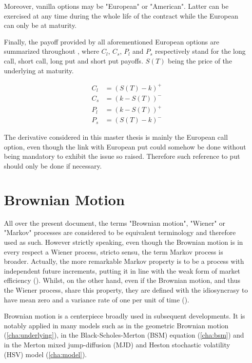 \documentclass[a4paper, 12pt]{report}
\begin{document}
Moreover, vanilla options may be "European" or "American". Latter can be exercised at any time during the whole life of the contract while the European can only be at maturity.

Finally, the payoff provided by all aforementioned European options are summarized throughout , where $C_l$, $C_s$, $P_l$ and $P_s$ respectively stand for the long call, short call, long put and short put payoffs. $S(T)$ being the price of the underlying at maturity.

\begin{align}
C_l &= \left(S(T) - k\right)^+ \label{eq:upstream:cl}\\
C_s &= \left(k - S(T)\right)^- \label{eq:upstream:cs}\\
P_l &= \left(k - S(T)\right)^+ \label{eq:upstream:pl}\\
P_s &= \left(S(T) - k\right)^- \label{eq:upstream:ps}
\end{align}

The derivative considered in this master thesis is mainly the European call option, even though the link with European put could somehow be done without being mandatory to exhibit the issue so raised. Therefore such reference to put should only be done if necessary.

\section{Brownian Motion}
\label{sec:upstream:brownian}
 
All over the present document, the terms "Brownian motion", "Wiener" or "Markov" processes are considered to be equivalent terminology and therefore used as such. However strictly speaking, even though the Brownian motion is in every respect a Wiener process, stricto sensu, the term Markov process is broader. 
Actually, the more remarkable Markov property is to be a process with independent future increments, putting it in line with the weak form of market efficiency (\citet{hull}).
Whilst, on the other hand, even if the Brownian motion, and thus the Wiener process, share this property, they are defined with the idiosyncrasy to have mean zero and a variance rate of one per unit of time (\citet{hull}).

Brownian motion is a centerpiece broadly used in subsequent developments. It is notably applied in many models such as in the geometric Brownian motion (\cref{cha:underlying}),  in the Black-Scholes-Merton (BSM) equation (\cref{cha:bsm}) and in the Merton mixed jump-diffusion (MJD) and Heston stochastic volatility (HSV) model (\cref{cha:model}).
\end{document}
